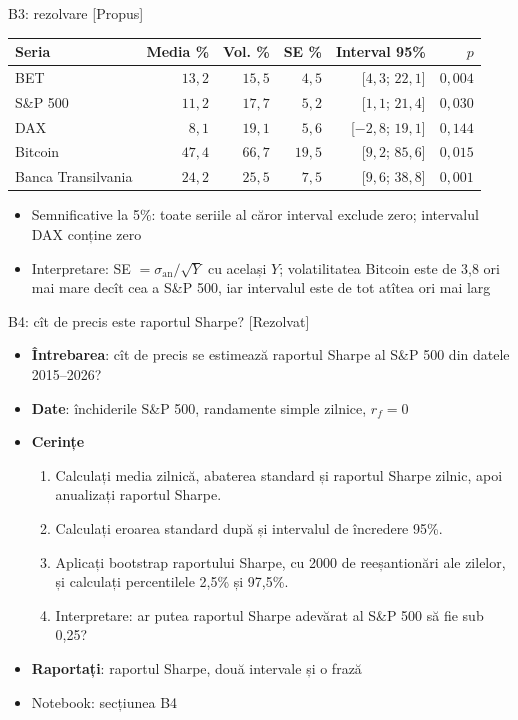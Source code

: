 \ifsolutions
\begin{frame}{B3: rezolvare [Propus]}
\itemsize{\footnotesize}
\begin{center}
\footnotesize
\begin{tabular}{lrrrrr}
\toprule
Seria & Media \% & Vol. \% & SE \% & Interval 95\% & $p$ \\
\midrule
BET & $13{,}2$ & $15{,}5$ & $4{,}5$ & [$4{,}3$; $22{,}1$] & $0{,}004$ \\
S\&P 500 & $11{,}2$ & $17{,}7$ & $5{,}2$ & [$1{,}1$; $21{,}4$] & $0{,}030$ \\
DAX & $8{,}1$ & $19{,}1$ & $5{,}6$ & [$-2{,}8$; $19{,}1$] & $0{,}144$ \\
Bitcoin & $47{,}4$ & $66{,}7$ & $19{,}5$ & [$9{,}2$; $85{,}6$] & $0{,}015$ \\
Banca Transilvania & $24{,}2$ & $25{,}5$ & $7{,}5$ & [$9{,}6$; $38{,}8$] & $0{,}001$ \\
\bottomrule
\end{tabular}
\end{center}
\begin{itemize}
    \item Semnificative la 5\%: toate seriile al căror interval exclude zero; intervalul DAX conține zero
    \item Interpretare: SE $= \sigma_{\text{an}}/\sqrt{Y}$ cu același $Y$; volatilitatea Bitcoin este de 3{,}8 ori mai mare decît cea a S\&P 500, iar intervalul este de tot atîtea ori mai larg
\end{itemize}
\end{frame}
\fi

\begin{frame}{B4: cît de precis este raportul Sharpe? [Rezolvat]}
\itemsize{\footnotesize}
\begin{itemize}
\item \textbf{Întrebarea}: cît de precis se estimează raportul Sharpe al S\&P 500 din datele 2015--2026?
\item \textbf{Date}: închiderile S\&P 500, randamente simple zilnice, $r_f = 0$
\item \textbf{Cerințe}
\begin{enumerate}
    \item Calculați media zilnică, abaterea standard și raportul Sharpe zilnic, apoi anualizați raportul Sharpe.
    \item Calculați eroarea standard după  și intervalul de încredere 95\%.
    \item Aplicați bootstrap raportului Sharpe, cu 2000 de reeșantionări ale zilelor, și calculați percentilele 2,5\% și 97,5\%.
    \item Interpretare: ar putea raportul Sharpe adevărat al S\&P 500 să fie sub 0,25?
\end{enumerate}
\item \textbf{Raportați}: raportul Sharpe, două intervale și o frază
\item Notebook: secțiunea B4
\end{itemize}
\end{frame}

